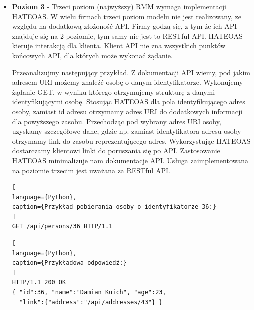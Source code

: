 \documentclass[oneside,polski,logo,indent]{amuthesis}
\begin{document}
\begin{itemize}
Drugi poziom wprowadza też roszerzenie dla naszych statusów odpowiedzi. Będziemy teraz wykorzystywać statusy zależnie od sposobu realizacji zapytania.
\begin{itemize}
\item 1XX – Kody informacyjne
\item 2XX – Kody powodzenia
\item 3XX – Kody przekierowania
\item 4XX – Kody błędu aplikacji klienta
\item 5XX – Kody błędu serwera
\end{itemize}

\begin{lstlisting}[
language={Python},
caption={Dodawanie np. rzeczy}
]
POST /api/addSomething HTTP/1.1
{ "item_name":"Chair" }
\end{lstlisting}

\begin{lstlisting}[
language={Python},
caption={Odpowiedzi}
]
201 Created
{ "item_id":50 }
 # or
409 Conflict
{ "error":"Wrong data input." }
\end{lstlisting}

\item \textbf{Poziom 3} - Trzeci poziom (najwyższy) RMM wymaga implementacji HATEOAS. W wielu firmach trzeci poziom modelu nie jest realizowany, ze względu na dodatkową złożoność API. Firmy godzą się, z tym że ich API znajduje się na 2 poziomie, tym samy nie jest to RESTful API. HATEOAS kieruje interakcją dla klienta. Klient API nie zna wszystkich punktów końcowych API, dla których może wykonać żądanie.

Przeanalizujmy następujący przykład. Z dokumentacji API wiemy, pod jakim adresem URI możemy znaleźć osobę o danym identyfikatorze. Wykonujemy żądanie GET, w wyniku którego otrzymujemy strukturę z danymi identyfikującymi osobę. Stosując HATEOAS dla pola identyfikującego adres osoby, zamiast id adresu otrzymamy adres URI do dodatkowych informacji dla powyższego zasobu. Przechodząc pod wybrany adres URI osoby, uzyskamy szczegółowe dane, gdzie np. zamiast identyfikatora adresu osoby otrzymamy link do zasobu reprezentującego adres. Wykorzystując HATEOAS dostarczamy klientowi linki do poruszania się po API. Zastosowanie HATEOAS minimalizuje nam dokumentacje API. Usługa zaimplementowana na poziomie trzecim jest uważana za RESTful API.

\begin{lstlisting}[
language={Python},
caption={Przykład pobierania osoby o identyfikatorze 36:}
]
GET /api/persons/36 HTTP/1.1
\end{lstlisting}

\begin{lstlisting}[
language={Python},
caption={Przykładowa odpowiedź:}
]
HTTP/1.1 200 OK
{ "id":36, "name":"Damian Kuich", "age":23,
  "link":{"address":"/api/addresses/43"} }
\end{lstlisting} 

\end{itemize}
\end{document}
